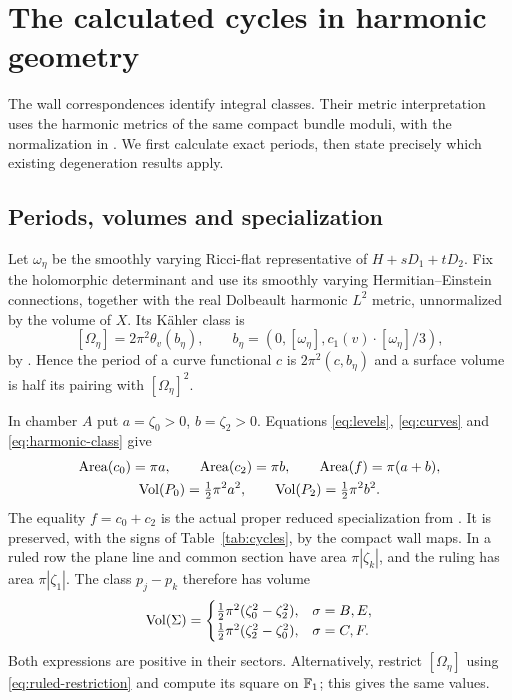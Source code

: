 \section{The calculated cycles in harmonic geometry}\label{sec:metrics}

The wall correspondences identify integral classes. Their metric
interpretation uses the harmonic metrics of the same compact
bundle moduli, with the normalization in
\cite{wuebben17,wuebben18}. We first calculate exact periods,
then state precisely which existing degeneration results apply.

\subsection{Periods, volumes and specialization}
Let $\omega_\eta$ be the smoothly varying Ricci-flat representative
of $H+sD_1+tD_2$. Fix the holomorphic determinant and use its
smoothly varying Hermitian--Einstein connections, together with the
real Dolbeault harmonic $L^2$ metric, unnormalized by the volume of $X$.
Its K\"ahler class is
\begin{equation}\label{eq:harmonic-class}
 [\Omega_\eta]=2\pi^2\theta_v(b_\eta),\qquad
 b_\eta=(0,[\omega_\eta],c_1(v)\cdot[\omega_\eta]/3),
\end{equation}
by \cite[\S2.4]{wuebben17}. Hence the period of a curve
functional $c$ is $2\pi^2(c,b_\eta)$ and a surface volume is
half its pairing with $[\Omega_\eta]^2$.

In chamber $A$ put $a=\zeta_0>0$, $b=\zeta_2>0$. Equations
\eqref{eq:levels}, \eqref{eq:curves} and
\eqref{eq:harmonic-class} give
\begin{equation}\label{eq:periods}
 \begin{gathered}
 \operatorname{Area}(c_0)=\pi a,\qquad \operatorname{Area}(c_2)=\pi b,\qquad
 \operatorname{Area}(f)=\pi(a+b),\\
 \operatorname{Vol}(P_0)=\tfrac12\pi^2a^2,\qquad
 \operatorname{Vol}(P_2)=\tfrac12\pi^2b^2.
 \end{gathered}
\end{equation}
The equality $f=c_0+c_2$ is the actual proper reduced
specialization from \cite[\S5.1]{wuebben17}. It is
preserved, with the signs of Table~\ref{tab:cycles}, by
the compact wall maps. In a ruled row the plane line and
common section have area $\pi|\zeta_k|$, and the ruling
has area $\pi|\zeta_1|$. The class $p_j-p_k$ therefore has
volume
\begin{equation}\label{eq:ruled-volumes}
 \operatorname{Vol}(\Sigma)=
 \begin{cases}
 \tfrac12\pi^2(\zeta_0^2-\zeta_2^2),&\sigma=B,E,\\
 \tfrac12\pi^2(\zeta_2^2-\zeta_0^2),&\sigma=C,F.
 \end{cases}
\end{equation}
Both expressions are positive in their sectors. Alternatively,
restrict $[\Omega_\eta]$ using
\eqref{eq:ruled-restriction} and compute its square on
$\mathbb F_1$; this gives the same values.

